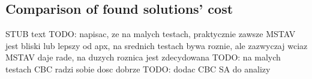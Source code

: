 \subsection{Comparison of found solutions' cost}
STUB text
TODO: napisac, ze na malych testach, praktycznie zawsze MSTAV jest bliski lub lepszy od apx,
na srednich testach bywa roznie, ale zazwyczaj wciaz MSTAV daje rade,
na duzych roznica jest zdecydowana
TODO: na malych testach CBC radzi sobie dosc dobrze
TODO: dodac CBC SA do analizy
\begin{figure}[ht]
  \centering
  
\end{figure}

\begin{figure}[ht]
  \centering
  
\end{figure}

\begin{figure}[ht]
  \centering
  
\end{figure}

\begin{figure}[ht]
  \centering
  
\end{figure}

